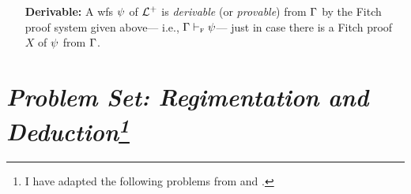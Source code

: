 \documentclass[a4paper, 11pt]{article} %
\begin{document}
\begin{enumerate}
	\item[\bf Derivable:]
	      A wfs $\psi$ of $\mathcal{L}^+$ is \textit{derivable} (or \textit{provable}) from $\Gamma$ by the Fitch proof system given above--- i.e., $\Gamma \vdash_{\textsc{f}} \psi$--- just in case there is a Fitch proof $X$ of $\psi$ from $\Gamma$.
\end{enumerate}



\section*{\it Problem Set: Regimentation and Deduction\footnote{I have adapted the following problems from \citet{Goldfarb2003} and \citet{Laboreo2005}.}}
\end{document}

